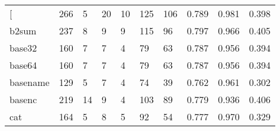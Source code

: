 \begin{longtable}{lp{2.0cm}p{2.0cm}p{2.0cm}p{2.0cm}p{2.0cm}p{2.0cm}p{2.0cm}p{2.0cm}p{2.0cm}}
\bottomrule
\endlastfoot
{[}         &                    266 &                                  5 &                                20 &                               10 &                               125 &                             106 &                                   0.789 &                                  0.981 &                                0.398 \\
b2sum     &                    237 &                                  8 &                                 9 &                                9 &                               115 &                              96 &                                   0.797 &                                  0.966 &                                0.405 \\
base32    &                    160 &                                  7 &                                 7 &                                4 &                                79 &                              63 &                                   0.787 &                                  0.956 &                                0.394 \\
base64    &                    160 &                                  7 &                                 7 &                                4 &                                79 &                              63 &                                   0.787 &                                  0.956 &                                0.394 \\
basename  &                    129 &                                  5 &                                 7 &                                4 &                                74 &                              39 &                                   0.762 &                                  0.961 &                                0.302 \\
basenc    &                    219 &                                 14 &                                 9 &                                4 &                               103 &                              89 &                                   0.779 &                                  0.936 &                                0.406 \\
cat       &                    164 &                                  5 &                                 8 &                                5 &                                92 &                              54 &                                   0.777 &                                  0.970 &                                0.329 \\

\end{longtable}
